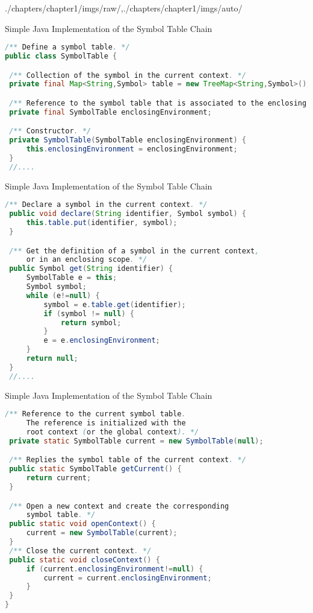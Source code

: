 \begin{graphicspathcontext}{{./chapters/chapter1/imgs/raw/},{./chapters/chapter1/imgs/auto/}}
\begin{bibunit}[apalike]
\begin{frame}[t,fragile]{{Simple Java Implementation} of the Symbol Table Chain}
\begin{lstlisting}[language=java,basicstyle=\normalcolor\smaller\smaller]
/** Define a symbol table. */
public class SymbolTable {

 /** Collection of the symbol in the current context. */
 private final Map<String,Symbol> table = new TreeMap<String,Symbol>();

 /** Reference to the symbol table that is associated to the enclosing scope. */
 private final SymbolTable enclosingEnvironment;

 /** Constructor. */
 private SymbolTable(SymbolTable enclosingEnvironment) {
     this.enclosingEnvironment = enclosingEnvironment;
 }
 //....
	\end{lstlisting}
\end{frame}

\begin{frame}[t,fragile]{{Simple Java Implementation} of the Symbol Table Chain}
	\begin{lstlisting}[language=java,basicstyle=\normalcolor\smaller\smaller]
 /** Declare a symbol in the current context. */
 public void declare(String identifier, Symbol symbol) {
     this.table.put(identifier, symbol);
 }

 /** Get the definition of a symbol in the current context,
     or in an enclosing scope. */
 public Symbol get(String identifier) {
     SymbolTable e = this;
     Symbol symbol;
     while (e!=null) {
         symbol = e.table.get(identifier);
         if (symbol != null) {
             return symbol;
         }
         e = e.enclosingEnvironment;
     }
     return null;
 }
 //....
	\end{lstlisting}
\end{frame}

\begin{frame}[t,fragile]{{Simple Java Implementation} of the Symbol Table Chain}
	\begin{lstlisting}[language=java,basicstyle=\normalcolor\smaller\smaller]
 /** Reference to the current symbol table.
     The reference is initialized with the
     root context (or the global context). */
 private static SymbolTable current = new SymbolTable(null);

 /** Replies the symbol table of the current context. */
 public static SymbolTable getCurrent() {
     return current;
 }

 /** Open a new context and create the corresponding
     symbol table. */
 public static void openContext() {
     current = new SymbolTable(current);
 }
 /** Close the current context. */
 public static void closeContext() {
     if (current.enclosingEnvironment!=null) {
         current = current.enclosingEnvironment;
     }
 }
}
	\end{lstlisting}
\end{frame}


\end{bibunit}
\end{graphicspathcontext}
